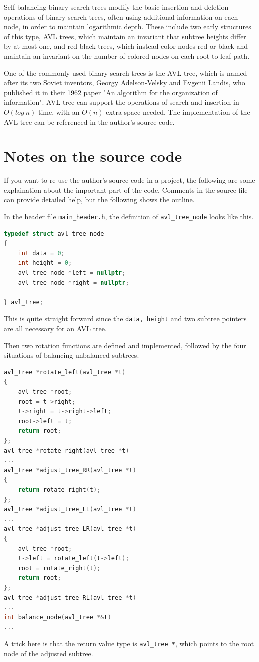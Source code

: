 \documentclass[cn,black,12pt,normal]{elegantnote}
\begin{document}
Self-balancing binary search trees modify the basic insertion and deletion operations of binary search trees, often using additional information on each node, in order to maintain logarithmic depth. These include two early structures of this type, AVL trees, which maintain an invariant that subtree heights differ by at most one, and red-black trees, which instead color nodes red or black and maintain an invariant on the number of colored nodes on each root-to-leaf path.

One of the commonly used binary search trees is the AVL tree, which is named after its two Soviet inventors, Georgy Adelson-Velsky and Evgenii Landis, who published it in their 1962 paper "An algorithm for the organization of information". AVL tree can support the operations of search and insertion in $O(log\ n)$ time, with an $O(n)$ extra space needed. The implementation of the AVL tree can be referenced in the author's source code.

\section{Notes on the source code}

If you want to re-use the author's source code in a project, the following are some explaination about the important part of the code. Comments in the source file can provide detailed help, but the following shows the outline.

In the header file \lstinline{main_header.h}, the definition of \lstinline{avl_tree_node} looks like this.
\begin{lstlisting}[language = C++]
typedef struct avl_tree_node
{
	int data = 0;
	int height = 0;
	avl_tree_node *left = nullptr;
	avl_tree_node *right = nullptr;

} avl_tree;
\end{lstlisting}
This is quite straight forward since the \lstinline{data, height} and two subtree pointers are all necessary for an AVL tree.

Then two rotation functions are defined and implemented, followed by the four situations of balancing unbalanced subtrees.
\begin{lstlisting}[language = C++]
avl_tree *rotate_left(avl_tree *t)
{
	avl_tree *root;
	root = t->right;
	t->right = t->right->left;
	root->left = t;
	return root;
};
avl_tree *rotate_right(avl_tree *t)
...
avl_tree *adjust_tree_RR(avl_tree *t)
{
	return rotate_right(t);
};
avl_tree *adjust_tree_LL(avl_tree *t)
...
avl_tree *adjust_tree_LR(avl_tree *t)
{
	avl_tree *root;
	t->left = rotate_left(t->left);
	root = rotate_right(t);
	return root;
};
avl_tree *adjust_tree_RL(avl_tree *t)
...
int balance_node(avl_tree *&t)
...
\end{lstlisting}
A trick here is that the return value type is \lstinline{avl_tree *}, which points to the root node of the adjusted subtree.
\end{document}
